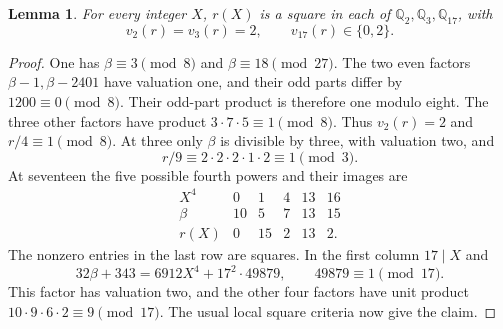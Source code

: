 \documentclass[11pt,a4paper]{article}
\newtheorem{lemma}[theorem]{Lemma}
\newcommand{\Q}{\mathbb Q}\newcommand{\Z}{\mathbb Z}
\begin{document}
\begin{lemma}\label{lem:small-primes}
For every integer $X$, $r(X)$ is a square in each of
$\Q_2,\Q_3,\Q_{17}$, with
\[
 v_2(r)=v_3(r)=2,\qquad v_{17}(r)\in\{0,2\}.
\]
\end{lemma}
\begin{proof}
One has $\beta\equiv3\pmod8$ and $\beta\equiv18\pmod{27}$.
The two even factors $\beta-1,\beta-2401$ have valuation one,
and their odd parts differ by $1200\equiv0\pmod8$. Their
odd-part product is therefore one modulo eight. The three
other factors have product $3\cdot7\cdot5\equiv1\pmod8$.
Thus $v_2(r)=2$ and $r/4\equiv1\pmod8$.
At three only $\beta$ is divisible by three, with valuation
two, and
\[
 r/9\equiv2\cdot2\cdot2\cdot1\cdot2\equiv1\pmod3.
\]
At seventeen the five possible fourth powers and their images
are
\[
 \begin{array}{c|rrrrr}
 X^4&0&1&4&13&16\\\hline
 \beta&10&5&7&13&15\\
 r(X)&0&15&2&13&2.
 \end{array}
\]
The nonzero entries in the last row are squares. In the first
column $17\mid X$ and
\[
 32\beta+343=6912X^4+17^2\cdot49879,
 \qquad49879\equiv1\pmod{17}.
\]
This factor has valuation two, and the other four factors have
unit product $10\cdot9\cdot6\cdot2\equiv9\pmod{17}$.
The usual local square criteria now give the claim.
\end{proof}
\end{document}
